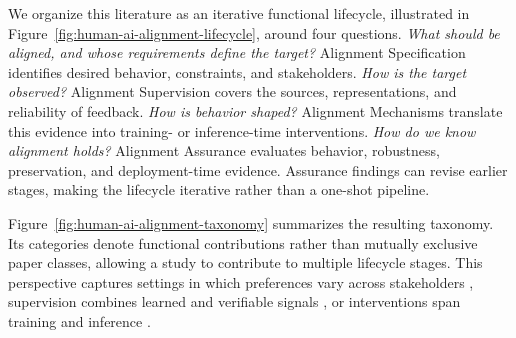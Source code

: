 \documentclass[11pt]{article}
\begin{document}
We organize this literature as an iterative functional lifecycle, illustrated in Figure~\ref{fig:human-ai-alignment-lifecycle}, around four questions. \emph{What should be aligned, and whose requirements define the target?} Alignment Specification identifies desired behavior, constraints, and stakeholders. \emph{How is the target observed?} Alignment Supervision covers the sources, representations, and reliability of feedback. \emph{How is behavior shaped?} Alignment Mechanisms translate this evidence into training- or inference-time interventions. \emph{How do we know alignment holds?} Alignment Assurance evaluates behavior, robustness, preservation, and deployment-time evidence. Assurance findings can revise earlier stages, making the lifecycle iterative rather than a one-shot pipeline.

Figure~\ref{fig:human-ai-alignment-taxonomy} summarizes the resulting taxonomy. Its categories denote functional contributions rather than mutually exclusive paper classes, allowing a study to contribute to multiple lifecycle stages. This perspective captures settings in which preferences vary across stakeholders \citep{sorensen2024pluralistic,siththaranjan2024distributional}, supervision combines learned and verifiable signals \citep{mu2024rulebased,lightman2024verify}, or interventions span training and inference \citep{rimsky2024caa,greenblatt2024control}.
\end{document}
